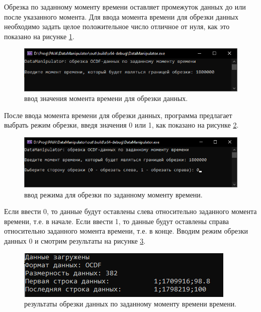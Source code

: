 {\standartFont

  \par Обрезка по заданному моменту времени оставляет промежуток данных до или после указанного момента. Для ввода момента времени для обрезки данных необходимо задать целое положительное число отличное от нуля, как это показано на рисунке \ref{fig:OCDFcutmom1}. 

  \begin{figure}[H]
    \centering
    \includegraphics{images/forDataManipulator/OCDFcutmomentstage1.png}
    \caption{ввод значения момента времени для обрезки данных.} 
    \label{fig:OCDFcutmom1}
  \end{figure}

  \par После ввода момента времени для обрезки данных, программа предлагает выбрать режим обрезки, введя значения 0 или 1, как показано на рисунке \ref{fig:OCDFcutmom2}. 

  \begin{figure}[H]
    \centering
    \includegraphics[width=\textwidth]{images/forDataManipulator/OCDFcutmomentstage2.png}
    \caption{ввод режима для обрезки по заданному моменту времени.} 
    \label{fig:OCDFcutmom2}
  \end{figure}

  \par Если ввести 0, то данные будут оставлены слева относительно заданного момента времени, т.е. в начале. Если ввести 1, то данные будут оставлены справа относительно заданного момента времени, т.е. в конце. Вводим режим обрезки данных 0 и смотрим результаты на рисунке \ref{fig:ExOCDFdataAftCatMom}. 

  \begin{figure}[H]
    \centering
    \includegraphics{images/forDataManipulator/ExOCDFdataAftCatMom.png}
    \caption{результаты обрезки данных по заданному моменту времени времени.} 
    \label{fig:ExOCDFdataAftCatMom}
  \end{figure}

  \par 
}

